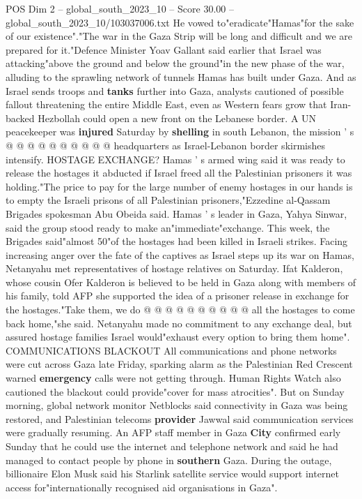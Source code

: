 \begin{textsample}{POS Dim 2 – global\_south\_2023\_10 – Score 30.00 – global\_south\_2023\_10/103037006.txt}
He vowed to"eradicate"Hamas"for the sake of our existence"."The war in the Gaza Strip will be long and difficult and we are prepared for it."Defence Minister Yoav Gallant said earlier that Israel was attacking"above the ground and below the ground"in the new phase of the war, alluding to the sprawling network of tunnels Hamas has built under Gaza.
And as Israel sends troops and \textbf{tanks} further into Gaza, analysts cautioned of possible fallout threatening the entire Middle East, even as Western fears grow that Iran-backed Hezbollah could open a new front on the Lebanese border.
A UN peacekeeper was \textbf{injured} Saturday by \textbf{shelling} in south Lebanon, the mission ' s @ @ @ @ @ @ @ @ @ @ headquarters as Israel-Lebanon border skirmishes intensify.
HOSTAGE EXCHANGE?
Hamas ' s armed wing said it was ready to release the hostages it abducted if Israel freed all the Palestinian prisoners it was holding."The price to pay for the large number of enemy hostages in our hands is to empty the Israeli prisons of all Palestinian prisoners,"Ezzedine al-Qassam Brigades spokesman Abu Obeida said.
Hamas ' s leader in Gaza, Yahya Sinwar, said the group stood ready to make an"immediate"exchange.
This week, the Brigades said"almost 50"of the hostages had been killed in Israeli strikes.
Facing increasing anger over the fate of the captives as Israel steps up its war on Hamas, Netanyahu met representatives of hostage relatives on Saturday.
Ifat Kalderon, whose cousin Ofer Kalderon is believed to be held in Gaza along with members of his family, told AFP she supported the idea of a prisoner release in exchange for the hostages."Take them, we do @ @ @ @ @ @ @ @ @ @ all the hostages to come back home,"she said.
Netanyahu made no commitment to any exchange deal, but assured hostage families Israel would"exhaust every option to bring them home".
COMMUNICATIONS BLACKOUT All communications and phone networks were cut across Gaza late Friday, sparking alarm as the Palestinian Red Crescent warned \textbf{emergency} calls were not getting through.
Human Rights Watch also cautioned the blackout could provide"cover for mass atrocities".
But on Sunday morning, global network monitor Netblocks said connectivity in Gaza was being restored, and Palestinian telecoms \textbf{provider} Jawwal said communication services were gradually resuming.
An AFP staff member in Gaza \textbf{City} confirmed early Sunday that he could use the internet and telephone network and said he had managed to contact people by phone in \textbf{southern} Gaza.
During the outage, billionaire Elon Musk said his Starlink satellite service would support internet access for"internationally recognised aid organisations in Gaza".

\end{textsample}
